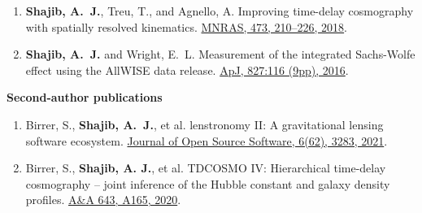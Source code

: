 \documentclass[margin, line]{res}
\begin{document}
\begin{resume}
\begin{enumerate}
	\item \textbf{Shajib, A.~J.}, Treu, T., and Agnello, A. Improving time-delay cosmography with spatially resolved kinematics. \href{https://doi.org/10.1093/mnras/stx2302}{MNRAS, 473, 210--226, 2018}.
	\item \textbf{Shajib, A.~J.} and Wright, E.~L. Measurement of the integrated Sachs-Wolfe effect using the AllWISE data release. \href{http://dx.doi.org/10.3847/0004-637X/827/2/116}{ApJ, 827:116 (9pp), 2016}.
\end{enumerate}


\textbf{Second-author publications}
\begin{enumerate}
	\item Birrer, S., \textbf{Shajib, A.~J.}, et al. lenstronomy II: A gravitational lensing software ecosystem. \href{https://joss.theoj.org/papers/10.21105/joss.03283}{Journal of Open Source Software, 6(62), 3283, 2021}.
	\item Birrer, S., \textbf{Shajib, A. J.}, et al. TDCOSMO IV: Hierarchical time-delay cosmography -- joint inference of the Hubble constant and galaxy density profiles. \href{https://doi.org/10.1051/0004-6361/202038861}{A\&A 643, A165, 2020}.
\end{enumerate}



\end{resume}
\end{document}
